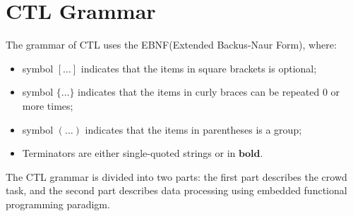 \chapter{CTL Grammar}
The grammar of CTL uses the EBNF(Extended Backus-Naur Form), where:
\begin{itemize}
    \item symbol $[\dots]$ indicates that the items in square brackets is optional;
    \item symbol $\{\dots\}$ indicates that the items in curly braces can be repeated 0 or more times;
    \item symbol $(\dots)$ indicates that the items in parentheses is a group;
    \item Terminators are either single-quoted strings or in $\mathbf{bold}$.
\end{itemize}
The CTL grammar is divided into two parts: the first part describes the crowd task, and the second part describes data processing using embedded functional programming paradigm.



